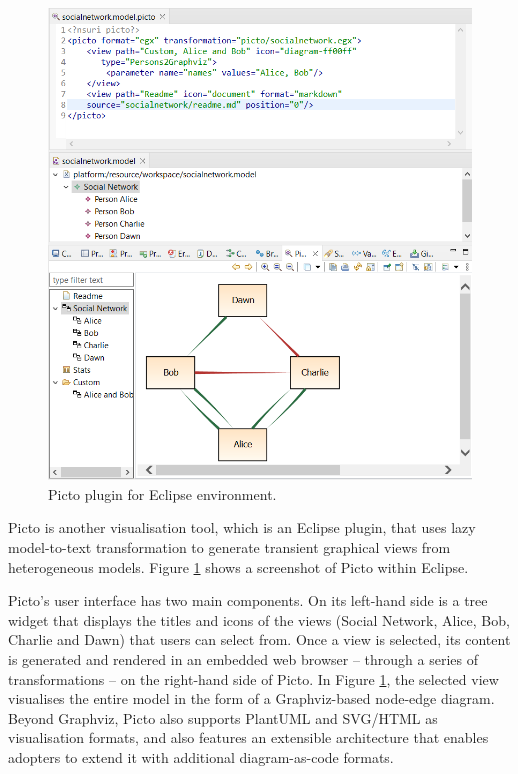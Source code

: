 \documentclass[preprint,12pt, a4paper]{elsarticle}
\begin{document}
\begin{figure}
  \centering
  \includegraphics[width=\linewidth]{images/picto-eclipse.png}
  \caption{Picto plugin for Eclipse environment.
  }
  \label{fig:picto-eclipse}
\end{figure}

Picto \cite{dimitris2020picto} is another visualisation tool, which is an Eclipse plugin, that uses lazy model-to-text transformation to generate transient graphical views from heterogeneous models. Figure \ref{fig:picto-eclipse} shows a screenshot of Picto within Eclipse. 

Picto’s user interface has two main components. On its left-hand side is a tree widget that displays the titles and icons of the views (Social Network, Alice, Bob, Charlie and Dawn) that users can select from. Once a view is selected, its content is generated and rendered in an embedded web browser -- through a series of transformations -- on the right-hand side of Picto. In Figure \ref{fig:picto-eclipse}, the selected view visualises the entire model in the form of a Graphviz-based node-edge diagram. Beyond Graphviz, Picto also supports PlantUML and SVG/HTML as visualisation formats, and also features an extensible architecture that enables adopters to extend it with additional diagram-as-code formats.  
\end{document}
